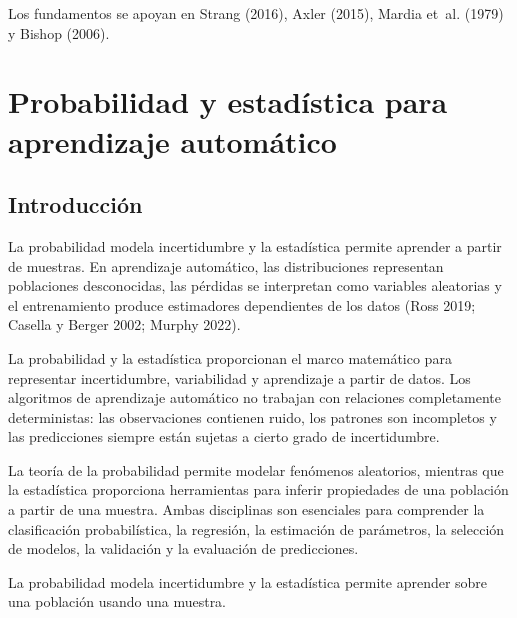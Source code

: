 \documentclass[
  spanish,
  10.5pt,
  letterpaper,
  DIV=11,
  numbers=noendperiod,
  oneside,
  open=any]{scrreprt}
\theoremstyle{definition}
\theoremstyle{definition}
\theoremstyle{plain}
\theoremstyle{remark}
\begin{document}

Los fundamentos se apoyan en Strang (2016), Axler (2015), Mardia et~al.
(1979) y Bishop (2006).

\chapter{\texorpdfstring{Probabilidad y estadística
para aprendizaje
automático}{Probabilidad y estadística para aprendizaje automático}}\label{sec-probabilidad-estadistica}

\section*{Introducción}\label{introducciuxf3n-3}


La probabilidad modela incertidumbre y la estadística permite aprender a
partir de muestras. En aprendizaje automático, las distribuciones
representan poblaciones desconocidas, las pérdidas se interpretan como
variables aleatorias y el entrenamiento produce estimadores dependientes
de los datos (Ross 2019; Casella y Berger 2002; Murphy 2022).

La probabilidad y la estadística proporcionan el marco matemático para
representar incertidumbre, variabilidad y aprendizaje a partir de datos.
Los algoritmos de aprendizaje automático no trabajan con relaciones
completamente deterministas: las observaciones contienen ruido, los
patrones son incompletos y las predicciones siempre están sujetas a
cierto grado de incertidumbre.

La teoría de la probabilidad permite modelar fenómenos aleatorios,
mientras que la estadística proporciona herramientas para inferir
propiedades de una población a partir de una muestra. Ambas disciplinas
son esenciales para comprender la clasificación probabilística, la
regresión, la estimación de parámetros, la selección de modelos, la
validación y la evaluación de predicciones.

\begin{tcolorbox}[enhanced jigsaw, arc=.35mm, bottomrule=.15mm, bottomtitle=1mm, breakable, colback=white, colbacktitle=quarto-callout-important-color!10!white, colframe=quarto-callout-important-color-frame, coltitle=black, left=2mm, leftrule=.75mm, opacityback=0, opacitybacktitle=0.6, rightrule=.15mm, title=\textcolor{quarto-callout-important-color}{\faExclamation}\hspace{0.5em}{Idea central}, titlerule=0mm, toprule=.15mm, toptitle=1mm]

La probabilidad modela incertidumbre y la estadística permite aprender
sobre una población usando una muestra.

\end{tcolorbox}
\end{document}
